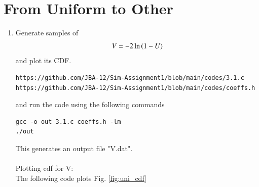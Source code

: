\documentclass[journal,12pt,twocolumn]{IEEEtran}
\renewcommand\thesection{\arabic{section}}
\begin{document}
\section{From Uniform to Other}
\begin{enumerate}[label=\thesection.\arabic*
,ref=\thesection.\theenumi]
%
\item
Generate samples of 
%
\begin{equation}
V = -2\ln\left(1-U\right)
\end{equation}
%
and plot its CDF. \\
\solution
\begin{lstlisting}
https://github.com/JBA-12/Sim-Assignment1/blob/main/codes/3.1.c
https://github.com/JBA-12/Sim-Assignment1/blob/main/codes/coeffs.h
\end{lstlisting}
and run the code using the following commands
\begin{lstlisting}
gcc -o out 3.1.c coeffs.h -lm
./out
\end{lstlisting}
This generates an output file "V.dat".\\\\
Plotting cdf for V:\\
The following code plots Fig. \ref{fig:uni_cdf}\\\\


\end{enumerate}
\end{document}
